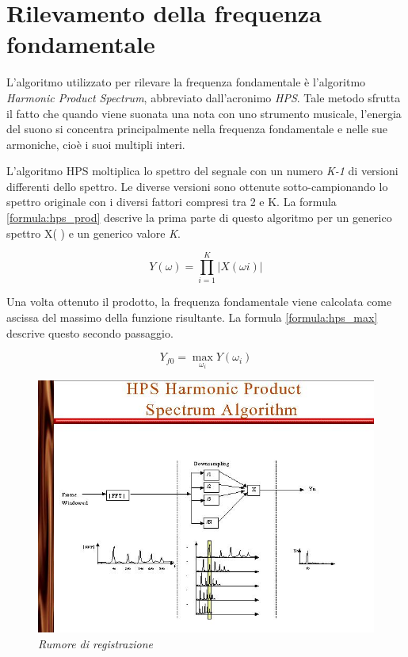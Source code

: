 \chapter*{Rilevamento della frequenza fondamentale}\label{cap:rilevamento_frequenza}

L'algoritmo utilizzato per rilevare la frequenza fondamentale è l'algoritmo \emph{Harmonic Product Spectrum}, abbreviato dall'acronimo \emph{HPS}.
Tale metodo sfrutta il fatto che quando viene suonata una nota con uno strumento musicale, l'energia del suono si concentra principalmente nella frequenza fondamentale e nelle sue armoniche, cioè i suoi multipli interi.

L'algoritmo HPS moltiplica lo spettro del segnale con un numero \emph{K-1} di versioni differenti dello spettro.
Le diverse versioni sono ottenute sotto-campionando lo spettro originale con i diversi fattori compresi tra 2 e K.
La formula \ref{formula:hps_prod} descrive la prima parte di questo algoritmo per un generico spettro X( \omega ) e un generico valore \emph{K}.

\begin{equation}\label{formula:hps_prod}
	Y(\omega) = \prod_{i=1}^K \left | X(\omega i) \right |
\end{equation}

Una volta ottenuto il prodotto, la frequenza fondamentale viene calcolata come ascissa del massimo della funzione risultante. 
La formula \ref{formula:hps_max} descrive questo secondo passaggio.

\begin{equation}\label{formula:hps_max}
	Y_{f0} = \max_{\omega_i} Y \left(\omega_i \right )
\end{equation}

 

	\begin{figure}[h]
	  \begin{center} 
	    \includegraphics[width=\textwidth*\real{0.9}]{images/ch_04/processo.jpg}
	  \end{center} 
	  \caption{\textit{Rumore di registrazione}}  
	  \label{fig:rumore}
	\end{figure}


